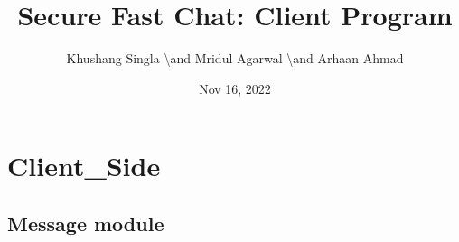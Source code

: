 \documentclass[letterpaper,10pt,english]{sphinxmanual}
\title{Secure Fast Chat: Client Program}
\date{Nov 16, 2022}
\author{Khushang Singla \textbackslash{}and Mridul Agarwal \textbackslash{}and Arhaan Ahmad}
\begin{document}
\pagestyle{empty}
\sphinxmaketitle
\pagestyle{plain}
\sphinxtableofcontents
\pagestyle{normal}
\label{\detokenize{index::doc}}



\chapter{Client\_Side}
\label{\detokenize{modules:client-side}}\label{\detokenize{modules::doc}}

\section{Message module}
\label{\detokenize{Message:module-Message}}\label{\detokenize{Message:message-module}}\label{\detokenize{Message::doc}}
\end{document}
